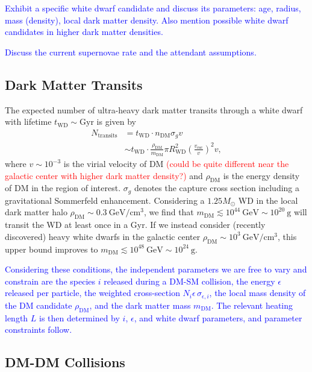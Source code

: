 \documentclass[twocolumn,showpacs,preprintnumbers,amsmath,amssymb,prd]{revtex4}
\newcommand{\GeV}{\text{GeV}}
\def\r{\right)}
\def\l{\left(}
\begin{document}
\textcolor{blue}{Exhibit a specific white dwarf candidate and discuss its parameters: age, radius, mass (density), local dark matter density. Also mention possible white dwarf candidates in higher dark matter densities.}

\textcolor{blue}{Discuss the current supernovae rate and the attendant assumptions.}

\subsection{Dark Matter Transits}
\label{sec:TransitConstraints}

The expected number of ultra-heavy dark matter transits through a white dwarf with lifetime $t_\text{WD} \sim \text{Gyr}$ is given by
\begin{align}
N_\text{transits}  &= t_\text{WD} \cdot n_\text{DM} \sigma_g v \\
 &  \sim t_\text{WD} \cdot \frac{\rho_{\text{DM}}}{m_\text{DM}} \pi R_\text{WD}^2 \l\frac{v_\text{esc}}{v}\r^2 v,
\end{align}
where $v \sim 10^{-3}$ is the virial velocity of DM \textcolor{red}{(could be quite different near the galactic center with higher dark matter density?)} and $\rho_{\text{DM}}$ is the energy density of DM in the region of interest. $\sigma_g$ denotes the capture cross section including a gravitational Sommerfeld enhancement. Considering a $1.25 M_{\odot}$ WD in the local dark matter halo $\rho_{\text{DM}} \sim 0.3 ~\text{GeV}/\text{cm}^3$, we find that $m_\text{DM} \lesssim 10^{44} ~\GeV \sim 10^{20} ~\text{g}$ will transit the WD at least once in a Gyr. If we instead consider (recently discovered) heavy white dwarfs in the galactic center $\rho_{\text{DM}} \sim 10^3 ~\text{GeV}/\text{cm}^3$, this upper bound improves to $m_\text{DM} \lesssim 10^{48} ~\GeV \sim 10^{24} ~\text{g}$.

\textcolor{blue}{Considering these conditions, the independent parameters we are free to vary and constrain are the species $i$ released during a DM-SM collision, the energy $\epsilon$ released per particle, the weighted cross-section $N_i \epsilon\, \sigma_{\epsilon,i}$, the local mass density of the DM candidate $\rho_\text{DM}$, and the dark matter mass $m_\text{DM}$. The relevant heating length $L$ is then determined by $i$, $\epsilon$, and white dwarf parameters, and parameter constraints follow.}


\subsection{DM-DM Collisions}
\label{sec:CollisionConstraints}
\end{document}
